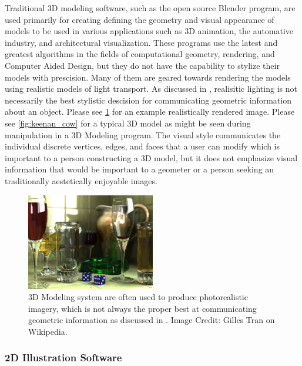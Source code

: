 \documentclass[12pt, letterpaper]{article}
\begin{document}
		Traditional 3D modeling software, such as the open source Blender program, are used primarily for creating defining the geometry and visual appearance of models to be 
		used in various applications such as 3D animation, the automative industry, and architectural visualization.
		These programs use the latest and greatest algorithms in the fields of computational geometry, rendering, and Computer Aided Design,
		but they do not have the capability to stylize their models with prescision. Many of them are geared towards rendering the models using 
		realistic models of light transport. As discussed in \cite{JDA08}, realisitic lighting is not necessarily the best stylistic descision for communicating
		geometric information about an object. Please see \ref{fig:photorealistic_rendering} for an example realistically rendered image.
		Please see \ref{fig:keenan_cow} for a typical 3D model as might be seen during manipulation in a 3D Modeling program. The visual style communicates
		the individual discrete vertices, edges, and faces that a user can modify which is important to a person constructing a 3D model, but it does not
		emphasize visual information that would be important to a geometer or a person seeking an traditionally aestetically enjoyable images.

		\begin{figure}[h]
		\centering
		\includegraphics[width=0.5\textwidth]{PhotorealisticRendering}
		\caption{3D Modeling system are often used to produce photorealistic imagery, which is not always the proper best at communicating geometric information as discussed in \cite{JDA08}.
				Image Credit: Gilles Tran on Wikipedia.}
		\label{fig:photorealistic_rendering}
		\end{figure}

		\subsubsection{2D Illustration Software}
\end{document}
